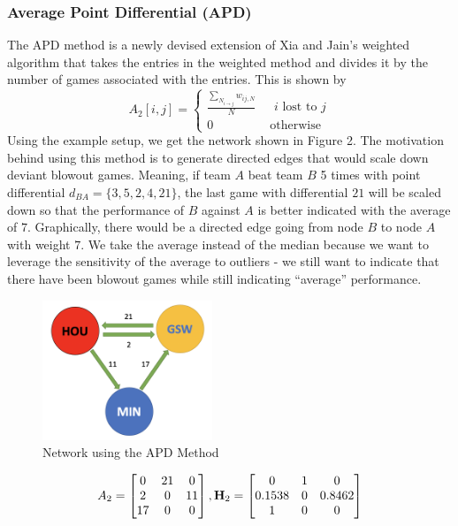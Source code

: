 \documentclass[12pt]{article}%
\begin{document}
\subsubsection{Average Point Differential (APD)}
  \null\quad\quad The APD method is a newly devised extension of Xia and Jain's weighted algorithm that takes the entries in the weighted method and divides it by the number of games associated with the entries. This is shown by 
  \[
  A_{2}[i,j]=
  \begin{cases}
  \frac{\sum_{N_{i\rightarrow j}}w_{ij,N}}N &\text{ $i$ lost to $j$}\\
  0 &\text{ otherwise}
  \end{cases}
  \]
  Using the example setup, we get the network shown in Figure 2. The motivation behind using this method is to generate directed edges that would scale down deviant blowout games. Meaning, if team $A$ beat team $B$ 5 times with point differential $d_{BA}=\{3,5,2,4,21\}$, the last game with differential $21$ will be scaled down so that the performance of $B$ against $A$ is better indicated with the average of $7$. Graphically, there would be a directed edge going from node $B$ to node $A$ with weight $7$. We take the average instead of the median because we want to leverage the sensitivity of the average to outliers - we still want to indicate that there have been blowout games while still indicating ``average'' performance. 
  \begin{figure}[H]
	\centering
	\includegraphics[width=2in]{./images/APD.png}
	\caption[Network using the APD Method]{Network using the APD Method}
\end{figure}
\begin{align*}
A_2 =\begin{bmatrix}0 & 21 & 0\\2 & 0 & 11\\17 & 0 & 0\end{bmatrix}, \textbf H_2=\begin{bmatrix}0 & 1 & 0\\0.1538 & 0 & 0.8462\\1 & 0 & 0\end{bmatrix}
\end{align*}
  
\end{document}
